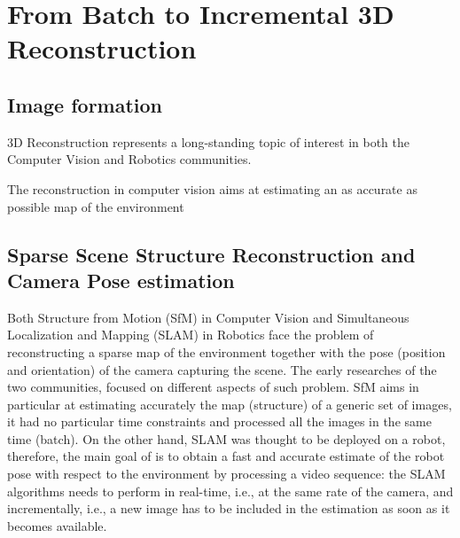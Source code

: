 \chapter{From Batch to Incremental 3D Reconstruction}

\section{Image formation}



3D Reconstruction represents a long-standing topic of interest in both the Computer Vision and Robotics communities.



The reconstruction in computer vision aims at estimating an as accurate as possible map of the environment


\section{Sparse Scene Structure Reconstruction and Camera Pose estimation}
Both Structure from Motion (SfM) in Computer Vision and Simultaneous Localization and Mapping (SLAM) in Robotics face the problem of reconstructing a sparse map of the environment together with the pose (position and orientation) of the camera capturing the scene.
The early researches of the two communities, focused on different aspects of such problem.
SfM aims in particular at  estimating accurately the map (structure) of a generic set of images, it had no particular time constraints and processed all the images in the same time (batch).
On the other hand, SLAM was thought to be deployed on a robot, therefore, the main goal of is to obtain a fast and accurate estimate of the robot pose with respect to the environment by processing a video sequence: the SLAM algorithms needs to perform in real-time, i.e., at the same rate of the camera, and incrementally, i.e., a new image  has to be included in the estimation as soon as it becomes available.


